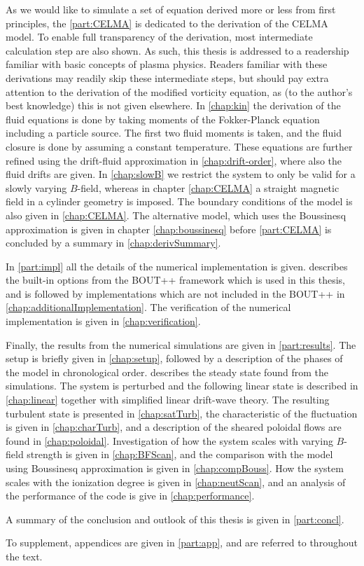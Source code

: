 As we would like to simulate a set of equation derived more or less from first principles, the \cref{part:CELMA} is dedicated to the derivation of the CELMA model.
To enable full transparency of the derivation, most intermediate calculation step are also shown.
As such, this thesis is addressed to a readership familiar with basic concepts of plasma physics.
Readers familiar with these derivations may readily skip these intermediate steps, but should pay extra attention to the derivation of the modified vorticity equation, as (to the author's best knowledge) this is not given elsewhere.
In \cref{chap:kin} the derivation of the fluid equations is done by taking moments of the Fokker-Planck equation including a particle source.
The first two fluid moments is taken, and the fluid closure is done by assuming a constant temperature.
These equations are further refined using the drift-fluid approximation in \cref{chap:drift-order}, where also the fluid drifts are given.
In \cref{chap:slowB} we restrict the system to only be valid for a slowly varying $B$-field, whereas in chapter \cref{chap:CELMA} a straight magnetic field in a cylinder geometry is imposed.
The boundary conditions of the model is also given in \cref{chap:CELMA}.
The alternative model, which uses the Boussinesq approximation is given in chapter \cref{chap:boussinesq} before \cref{part:CELMA} is concluded by a summary in \cref{chap:derivSummary}.

In \cref{part:impl} all the details of the numerical implementation is given.
 describes the built-in options from the BOUT++ framework which is used in this thesis, and is followed by implementations which are not included in the BOUT++ in \cref{chap:additionalImplementation}.
The verification of the numerical implementation is given in \cref{chap:verification}.

Finally, the results from the numerical simulations are given in \cref{part:results}.
The setup is briefly given in \cref{chap:setup}, followed by a description of the phases of the model in chronological order.
 describes the steady state found from the simulations.
The system is perturbed and the following linear state is described in \cref{chap:linear} together with simplified linear drift-wave theory.
The resulting turbulent state is presented in \cref{chap:satTurb}, the characteristic of the fluctuation is given in \cref{chap:charTurb}, and a description of the sheared poloidal flows are found in \cref{chap:poloidal}.
Investigation of how the system scales with varying $B$-field strength is given in \cref{chap:BFScan}, and the comparison with the model using Boussinesq approximation is given in \cref{chap:compBouss}.
How the system scales with the ionization degree is given in \cref{chap:neutScan}, and an analysis of the performance of the code is give in \cref{chap:performance}.

A summary of the conclusion and outlook of this thesis is given in \cref{part:concl}.

To supplement, appendices are given in \cref{part:app}, and are referred to throughout the text.
